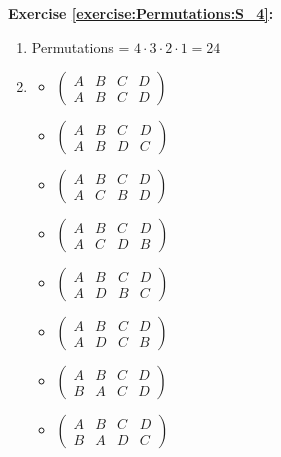 \noindent\textbf{Exercise \ref{exercise:Permutations:S_4}:}
\begin{enumerate}[{a.}]
\item
Permutations = $4 \cdot 3 \cdot 2 \cdot 1 = 24$

\item
	\begin{multicols}{3}
	\begin{itemize}
	\item
	$\begin{pmatrix}
	A & B & C & D\\
	A & B & C & D
	\end{pmatrix}$

	\item
	$\begin{pmatrix}
	A & B & C & D\\
	A & B & D & C
	\end{pmatrix}$
	
	\item
	$\begin{pmatrix}
	A & B & C & D\\
	A & C & B & D
	\end{pmatrix}$
	
	\item
	$\begin{pmatrix}
	A & B & C & D\\
	A & C & D & B
	\end{pmatrix}$
	
	\item
	$\begin{pmatrix}
	A & B & C & D\\
	A & D & B & C
	\end{pmatrix}$
	
	\item
	$\begin{pmatrix}
	A & B & C & D\\
	A & D & C & B
	\end{pmatrix}$
	
	\item
	$\begin{pmatrix}
	A & B & C & D\\
	B & A & C & D
	\end{pmatrix}$

	\item
	$\begin{pmatrix}
	A & B & C & D\\
	B & A & D & C
	\end{pmatrix}$
	

\end{itemize}
\end{multicols}
\end{enumerate}
